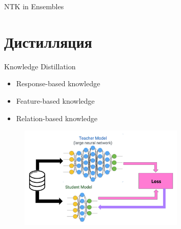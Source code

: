 \documentclass[9pt]{beamer}
\begin{document}
\begin{frame}{NTK in Ensembles}
    
\end{frame}

\section{Дистилляция}

\begin{frame}{Knowledge Distillation}
    \begin{block}{}
        \begin{itemize}
            \item Response-based knowledge
            \item Feature-based knowledge
            \item Relation-based knowledge
        \end{itemize}
    \end{block}

    \begin{figure}
        \centering
        \includegraphics[width=0.7\textwidth]{images/image6.png}
    \end{figure}
\end{frame}
\end{document}
